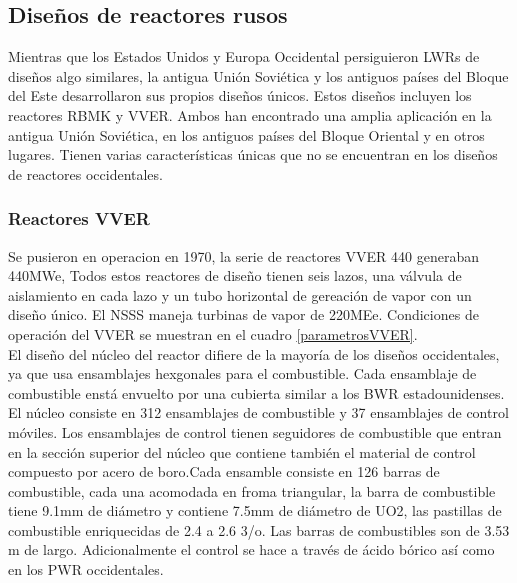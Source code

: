 \documentclass[]{article}
\begin{document}
\subsection{Diseños de reactores rusos}

Mientras que los Estados Unidos y Europa Occidental
persiguieron LWRs de diseños algo similares, la antigua Unión Soviética y los antiguos países del Bloque del Este desarrollaron sus propios diseños únicos. Estos diseños incluyen los reactores RBMK y VVER. Ambos han encontrado una amplia aplicación en la antigua Unión Soviética, en los antiguos países del Bloque Oriental y en otros lugares. Tienen varias características únicas que no se encuentran en los diseños de reactores occidentales.\citep{Lamarsh2001}

\subsubsection{Reactores VVER}

Se pusieron en operacion en 1970, la serie de reactores VVER 440 generaban 440MWe, Todos estos reactores de diseño tienen seis lazos, una válvula de aislamiento en cada lazo y un tubo horizontal de gereación de vapor con un diseño único. El NSSS maneja turbinas de vapor de 220MEe. Condiciones de operación del VVER se muestran en el cuadro \ref{parametrosVVER}.\\

El diseño del núcleo del reactor difiere de la mayoría de los diseños occidentales, ya que usa ensamblajes hexgonales para el combustible. Cada ensamblaje de combustible enstá envuelto por una cubierta similar a los BWR estadounidenses. El núcleo consiste en 312 ensamblajes de combustible y 37 ensamblajes de control móviles. Los ensamblajes de control tienen seguidores de combustible que entran en la sección superior del núcleo que contiene también el material de control compuesto por acero de boro.Cada ensamble consiste en 126 barras de combustible, cada una acomodada en froma triangular, la barra de combustible tiene 9.1mm de diámetro y contiene 7.5mm de diámetro de UO2, las pastillas de combustible enriquecidas de 2.4 a 2.6 3/o. Las barras de combustibles son de 3.53 m de largo. Adicionalmente el control se hace a través de ácido bórico así como en los PWR occidentales.\citep{Lamarsh2001}\\
 
\end{document}
